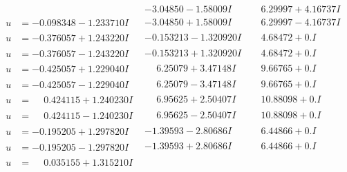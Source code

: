 \documentclass[1p]{elsarticle_modified}
\theoremstyle{definition}
\begin{document}
$$\begin{array}{c|c|c}
 & -3.04850 - 1.58009 I & \phantom{-}6.29997 + 4.16737 I \\ \hline\begin{aligned}
u &= -0.098348 - 1.233710 I\end{aligned}
 & -3.04850 + 1.58009 I & \phantom{-}6.29997 - 4.16737 I \\ \hline\begin{aligned}
u &= -0.376057 + 1.243220 I\end{aligned}
 & -0.153213 - 1.320920 I & \phantom{-}4.68472 + 0. I\phantom{ +0.000000I} \\ \hline\begin{aligned}
u &= -0.376057 - 1.243220 I\end{aligned}
 & -0.153213 + 1.320920 I & \phantom{-}4.68472 + 0. I\phantom{ +0.000000I} \\ \hline\begin{aligned}
u &= -0.425057 + 1.229040 I\end{aligned}
 & \phantom{-}6.25079 + 3.47148 I & \phantom{-}9.66765 + 0. I\phantom{ +0.000000I} \\ \hline\begin{aligned}
u &= -0.425057 - 1.229040 I\end{aligned}
 & \phantom{-}6.25079 - 3.47148 I & \phantom{-}9.66765 + 0. I\phantom{ +0.000000I} \\ \hline\begin{aligned}
u &= \phantom{-}0.424115 + 1.240230 I\end{aligned}
 & \phantom{-}6.95625 + 2.50407 I & \phantom{-}10.88098 + 0. I\phantom{ +0.000000I} \\ \hline\begin{aligned}
u &= \phantom{-}0.424115 - 1.240230 I\end{aligned}
 & \phantom{-}6.95625 - 2.50407 I & \phantom{-}10.88098 + 0. I\phantom{ +0.000000I} \\ \hline\begin{aligned}
u &= -0.195205 + 1.297820 I\end{aligned}
 & -1.39593 - 2.80686 I & \phantom{-}6.44866 + 0. I\phantom{ +0.000000I} \\ \hline\begin{aligned}
u &= -0.195205 - 1.297820 I\end{aligned}
 & -1.39593 + 2.80686 I & \phantom{-}6.44866 + 0. I\phantom{ +0.000000I} \\ \hline\begin{aligned}
u &= \phantom{-}0.035155 + 1.315210 I\end{aligned}

\end{array}$$
\end{document}
